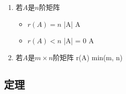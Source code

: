 \documentclass[a4paper,12pt]{article}
\begin{document}
\begin{enumerate}
\begin{enumerate}
            \item 若$A$是$n$阶矩阵
            \begin{itemize}
                \item $r(A) = n$ \Leftrightarrow |A|  \Leftrightarrow A
                \item $r(A) < n$ \Leftrightarrow |A| = 0 \Leftrightarrow A
            \end{itemize}
            \item 若$A$是$m \times n$阶矩阵 \Leftrightarrow r(A) \le min(m, n)
        \end{enumerate}
    \end{enumerate}

    \subsection{定理}
\end{document}
